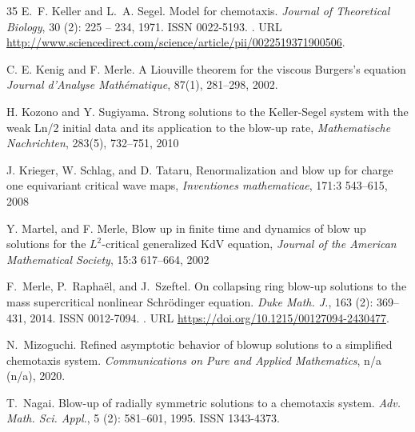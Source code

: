 \documentclass[11pt]{aims}
\theoremstyle{definition}
\numberwithin{equation}{section}
\begin{document}
\begin{thebibliography}{35}
E.~F. Keller and L.~A. Segel.
\newblock Model for chemotaxis.
\newblock \emph{Journal of Theoretical Biology}, 30 (2): 225
  -- 234, 1971{}.
\newblock ISSN 0022-5193.
\newblock {}.
\newblock URL
  \url{http://www.sciencedirect.com/science/article/pii/0022519371900506}.

C. E. Kenig and F. Merle.
\newblock A Liouville theorem for the viscous Burgers's equation
\newblock \emph{Journal d'Analyse Math\'ematique}, 87(1), 281--298, 2002.

H. Kozono and Y. Sugiyama.
\newblock Strong solutions to the Keller-Segel system with the weak Ln/2 initial data and its application to the blow-up rate,
\newblock \emph{Mathematische Nachrichten}, 283(5), 732--751, 2010



 J. Krieger, W. Schlag, and D. Tataru,
\newblock Renormalization and blow up for charge one equivariant critical wave maps,
\newblock \emph{Inventiones mathematicae}, 171:3 543--615, 2008


Y. Martel, and F. Merle,
\newblock Blow up in finite time and dynamics of blow up solutions for the $L^2$-critical generalized KdV equation,
\newblock \emph{Journal of the American Mathematical Society}, 15:3 617--664, 2002


F.~Merle, P.~Rapha\"{e}l, and J.~Szeftel.
\newblock On collapsing ring blow-up solutions to the mass supercritical
  nonlinear {S}chr\"{o}dinger equation.
\newblock \emph{Duke Math. J.}, 163 (2): 369--431, 2014.
\newblock ISSN 0012-7094.
\newblock {}.
\newblock URL \url{https://doi.org/10.1215/00127094-2430477}.

N.~Mizoguchi.
\newblock Refined asymptotic behavior of blowup solutions to a simplified
  chemotaxis system.
\newblock \emph{Communications on Pure and Applied Mathematics}, n/a
  (n/a), 2020.

T.~Nagai.
\newblock Blow-up of radially symmetric solutions to a chemotaxis system.
\newblock \emph{Adv. Math. Sci. Appl.}, 5 (2): 581--601,
  1995.
\newblock ISSN 1343-4373.


\end{thebibliography}
\end{document}
